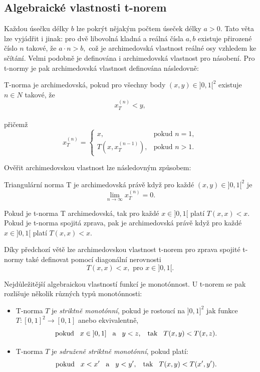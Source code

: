 \subsection{Algebraick\'e vlastnosti t-norem}

Každou \' usečku délky $b$ lze pokrýt nějakým počtem \' useček délky $a > 0.$ Tato věta lze vyjádřit i jinak: pro dvě libovolná kladná a reálná čísla $a,b$ existuje přirozené číslo $n$ takové, že $a\cdot n>b,$ což je archimedovská vlastnost reálné osy vzhledem ke sčítání. Velmi podobně je definována i archimedovská vlastnost pro násobení. Pro t-normy je pak archimedovská vlastnost definována následovně:
\begin{definition}
\cite{KMP}
    T-norma je archimedovská, pokud pro všechny body $(x,y) \in ]0,1[^2$ existuje $n \in N$ takové, že $$x_T^{(n)} < y,$$\\
    p\v ri\v cem\v z $$x^{(n)}_T=\begin{cases} x, &\mbox {pokud $n=1,$} \\ {T(x,x_T^{(n-1)})},
&\mbox {pokud $n>1.$}\end{cases}$$

\end{definition}
Ověřit archimedovskou vlastnost lze následovným zp\r usobem:
\begin{sentence} \cite{KMP}
    Triangulární norma T je archimedovská právě když pro každé $(x,y) \in ]0,1[^2$ je $$\lim_{n \to \infty}x_T^{(n)} = 0.$$
\end{sentence}
\begin{sentence} \cite{KMP}
    Pokud je t-norma T archimedovská, tak pro každé $x \in ]0,1[$ platí $T(x,x) < x.$\\
    Pokud je t-norma spojitá zprava, pak je archimedovská právě když pro každé $x \in ]0,1[$ platí $T(x,x) < x.$
\end{sentence}

    Díky p\v redchozí v\v et\v e lze  archimedovskou vlastnost t-norem pro zprava spojit\'e t-normy také definovat pomocí diagonální nerovnosti $$T(x,x) < x, \mbox{ pro } x \in ]0,1[.$$

    Nejd\r uležitější algebraickou vlastností funkcí je monot\' onnost. U t-norem se pak rozlišuje několik r\r uzných typ\r u monot\' onnosti:
    \begin{definition}
    \cite{KMP}
        \begin{itemize}
            \item T-norma $T$ je {\em striktně
            monot\' onní}, pokud
            je rostoucí na $]0,1]^2$ jak funkce $ T:[0,1]^2 \rightarrow [0,1]$ anebo
            ekvivalentně,
            $$ \text {pokud} \hskip 3mm x \in \hskip 1mm ]0,1] \hskip 3mm \text{a} \hskip 3mm y < z, \hskip 3mm \text {tak} \hskip 3mm T(x,y) < T(x,z). $$
            \item  T-norma $T$ je {\em sdruženě striktně
            monot\' onní}, pokud platí:
            $$ \text{pokud} \hskip 3mm  x < x'\hskip 3mm \text{a} \hskip 3mm y<y',
            \hskip 3mm  \text{tak} \hskip 3mm   T(x,y)<T(x',y').$$
            \end{itemize}
    \end{definition}

